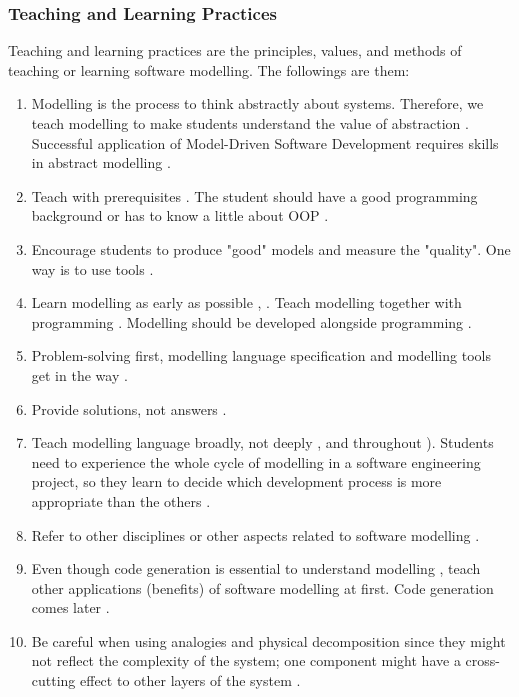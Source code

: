 \documentclass[12pt, a4paper]{report}
\begin{document}
\subsubsection{Teaching and Learning Practices}
Teaching and learning practices are the principles, values, and methods of teaching or learning software modelling. The followings are them:
\begin{enumerate}
\item Modelling is the process to think abstractly about systems. Therefore, we teach modelling to make students understand the value of abstraction \cite{bezivin2009teaching}. Successful application of Model-Driven Software Development requires skills in abstract modelling \cite{whittle2013industrial}.
\item Teach with prerequisites \cite{paige2014bad}. The student should have a good programming background \cite{bezivin2009teaching} or has to know a little about OOP \cite{Akayama2013}.
\item Encourage students to produce "good" models and measure the "quality". One way is to use tools \cite{Akayama2013}.
\item Learn modelling as early as possible \cite{Akayama2013}, \cite{borstler2012teaching}. Teach modelling together with programming \cite{borstler2012teaching}. Modelling should be developed alongside programming \cite{bezivin2009teaching}.
\item Problem-solving first, modelling language specification and modelling tools get in the way \cite{paige2014bad}.
\item Provide solutions, not answers \cite{paige2014bad}.
\item Teach modelling language broadly, not deeply \cite{paige2014bad}, and throughout \cite{borstler2012teaching}). Students need to experience the whole cycle of modelling in a software engineering project, so they learn to decide which development process is more appropriate than the others \cite{Akayama2013}.
\item Refer to other disciplines or other aspects related to software modelling \cite{paige2014bad}.
\item Even though code generation is essential to understand modelling \cite{liebel2015ready}, teach other applications (benefits) of software modelling at first. Code generation comes later \cite{paige2014bad}.
\item Be careful when using analogies and physical decomposition since they might not reflect the complexity of the system; one component might have a cross-cutting effect to other layers of the system \cite{paige2014bad}. 

\end{enumerate}
\end{document}
